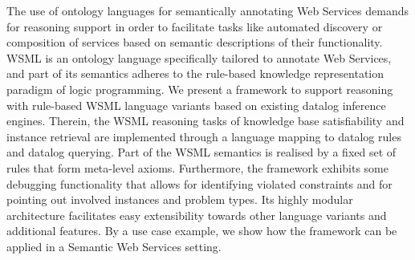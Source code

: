 The use of ontology languages for semantically annotating Web
Services demands for reasoning support in order to facilitate
tasks like automated discovery or composition of services based on
semantic descriptions of their functionality. WSML is an ontology
language specifically tailored to annotate Web Services, and part
of its semantics adheres to the rule-based knowledge
representation paradigm of logic programming. We present a
framework to support reasoning with rule-based WSML language
variants based on existing datalog inference engines. Therein, the
WSML reasoning tasks of knowledge base satisfiability and instance
retrieval are implemented through a language mapping to datalog
rules and datalog querying. Part of the WSML semantics is realised
by a fixed set of rules that form meta-level axioms. Furthermore,
the framework exhibits some debugging functionality that allows
for identifying violated constraints and for pointing out involved
instances and problem types. Its highly modular architecture
facilitates easy extensibility towards other language variants and
additional features. By a use case example, we show how the
framework can be applied in a Semantic Web Services setting.
